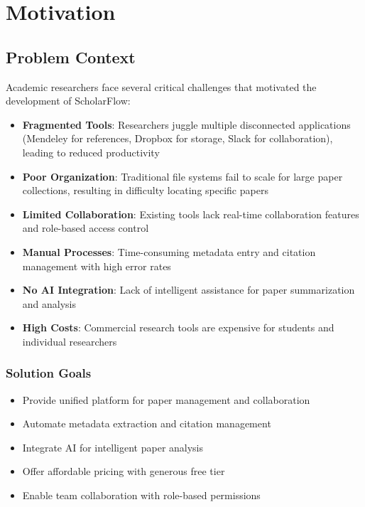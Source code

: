 \chapter{Motivation}
\label{ch:motivation}

\section{Problem Context}
\label{sec:problem-context}

Academic researchers face several critical challenges that motivated the development of ScholarFlow:

\begin{itemize}[leftmargin=*,topsep=5pt,itemsep=4pt]
    \item \textbf{Fragmented Tools}: Researchers juggle multiple disconnected applications (Mendeley for references, Dropbox for storage, Slack for collaboration), leading to reduced productivity
    
    \item \textbf{Poor Organization}: Traditional file systems fail to scale for large paper collections, resulting in difficulty locating specific papers
    
    \item \textbf{Limited Collaboration}: Existing tools lack real-time collaboration features and role-based access control
    
    \item \textbf{Manual Processes}: Time-consuming metadata entry and citation management with high error rates
    
    \item \textbf{No AI Integration}: Lack of intelligent assistance for paper summarization and analysis
    
    \item \textbf{High Costs}: Commercial research tools are expensive for students and individual researchers
\end{itemize}

\subsection{Solution Goals}

\begin{itemize}[leftmargin=*,topsep=5pt,itemsep=3pt]
    \item Provide unified platform for paper management and collaboration
    \item Automate metadata extraction and citation management
    \item Integrate AI for intelligent paper analysis
    \item Offer affordable pricing with generous free tier
    \item Enable team collaboration with role-based permissions
\end{itemize}
